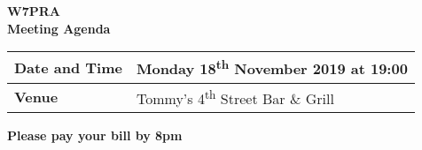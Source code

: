 \documentclass[letter,11pt]{extarticle}
\begin{document}
	\thispagestyle{empty}
	
	\begin{center}
		\textbf{W7PRA\\Meeting Agenda}
		\vspace{0.33cm}
	\end{center}
	
	\begin{center}
		\begin{tabular}{| m{3.0cm} | m{7.5cm} |} \hline
			\textbf{Date and Time} & Monday 18\textsuperscript{th} November 2019 at 19:00 \\ \hline
			\textbf{Venue} & Tommy's 4\textsuperscript{th} Street Bar \& Grill \\ \hline
				\end{tabular}
	\end{center}
	
	\begin{center}
		\textbf{Please pay your bill by 8pm}
	\end{center}
	
\end{document}
